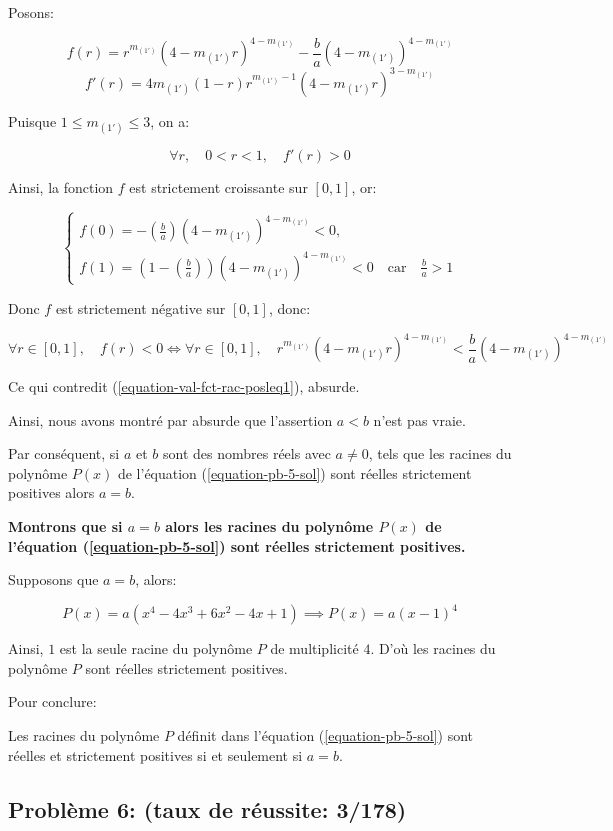 \documentclass[12pt,a4paper,article]{memoir}
\begin{document}
 Posons:
 
 \[f(r) = r^{m_{(1')}}(4 - m_{(1')}r)^{4 - m_{(1')}} - \frac{b}{a}(4 - m_{(1')})^{4 - m_{(1')}}\]
 \[f'(r) = 4m_{(1')}(1 - r)r^{m_{(1')} - 1}(4 - m_{(1')}r)^{3 - m_{(1')}}\]

Puisque $1 \leq m_{(1')} \leq 3$, on a:

\[\forall r, \quad 0 < r < 1, \quad f'(r) > 0\]

Ainsi, la fonction $f$ est strictement croissante sur $[0,1]$, or: 

\[
\left\{
	\begin{array}{l}
	f(0) = -\left(\frac{b}{a}\right)(4 - m_{(1')})^{4 - m_{(1')}} < 0,\\
	f(1) = (1 - \left(\frac{b}{a}\right))(4 - m_{(1')})^{4 - m_{(1')}} < 0 \quad \textrm{car} \quad \frac{b}{a} > 1
	\end{array}
\right.
\]

Donc $f$ est strictement négative sur $[0,1]$, donc:

\[\forall r \in [0,1], \quad f(r) < 0 \Longleftrightarrow \forall r \in [0,1], \quad r^{m_{(1')}}(4 - m_{(1')}r)^{4 - m_{(1')}} < \frac{b}{a}(4 - m_{(1')})^{4 - m_{(1')}}\] 

Ce qui contredit (\ref{equation-val-fct-rac-posleq1}), absurde.

\bigskip

Ainsi, nous avons montré par absurde que l'assertion $a < b$ n'est pas vraie.

\bigskip

Par conséquent, si $a$ et $b$ sont des nombres réels avec $a \neq 0$, tels que les racines du polynôme $P(x)$ de l'équation (\ref{equation-pb-5-sol}) sont réelles strictement positives alors $a = b$.

\bigskip

\textbf{Montrons que si $a = b$ alors les racines du polynôme $P(x)$ de l'équation (\ref{equation-pb-5-sol}) sont réelles strictement positives.}

\bigskip

Supposons que $a = b$, alors:

\[P(x) = a(x^4 - 4x^3 + 6x^2 - 4x + 1) \implies P(x) = a(x - 1)^4\]

Ainsi, $1$ est la seule racine du polynôme $P$ de multiplicité $4$. D'où les racines du polynôme $P$ sont réelles strictement positives.

\bigskip

Pour conclure:

\bigskip

Les racines du polynôme $P$ définit dans l'équation (\ref{equation-pb-5-sol}) sont réelles et strictement positives si et seulement si $a=b$.

\subsection{Problème 6: (taux de réussite: 3/178)}

\printbibliography %
\end{document}

